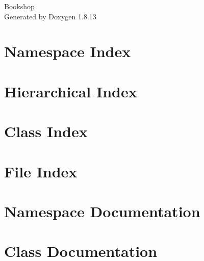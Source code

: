 \documentclass[twoside]{book}
\newcommand{\+}{\discretionary{\mbox{\scriptsize$\hookleftarrow$}}{}{}}
\newcommand{\clearemptydoublepage}{%
  \newpage{\pagestyle{empty}\cleardoublepage}%
}
\begin{document}
\hypersetup{pageanchor=false,
             bookmarksnumbered=true,
             pdfencoding=unicode
            }
\begin{titlepage}
\vspace*{7cm}
\begin{center}%
{\Large Bookshop }\\
\vspace*{1cm}
{\large Generated by Doxygen 1.8.13}\\
\end{center}
\end{titlepage}
\clearemptydoublepage
{}
\tableofcontents
\clearemptydoublepage
{}
\hypersetup{pageanchor=true}

\chapter{Namespace Index}

\chapter{Hierarchical Index}

\chapter{Class Index}

\chapter{File Index}

\chapter{Namespace Documentation}






\chapter{Class Documentation}




















\end{document}
